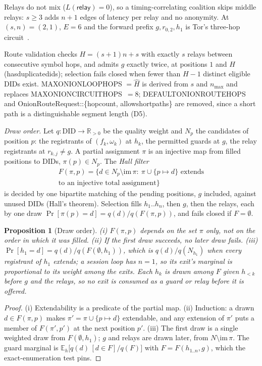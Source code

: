 \documentclass[journal]{IEEEtran}
\newtheorem{proposition}{Proposition}
\newcommand{\relay}{\mathsf{relay}}
\newcommand{\Hm}{\hat H}
\DeclareRobustCommand{\code}[1]{{\ttfamily\renewcommand{\_}{\textunderscore\allowbreak}#1}}
\begin{document}
Relays do not mix ($L(\relay)=0$), so a timing-correlating coalition skips
middle relays: $s\ge3$ adds $n+1$ edges of latency per relay and no
anonymity.  At $(s,n)=(2,1)$, $E=6$ and the forward prefix
$g,r_{0,2},h_1$ is Tor's three-hop circuit~\cite{Dingledine2004}.

Route validation checks $H=(s+1)n+s$ with exactly $s$ relays between
consecutive symbol hops, and admits $g$ exactly twice, at positions $1$
and $H$ (\code{has\_duplicate\_dids}); selection fails closed when fewer
than $H-1$ distinct eligible DIDs exist.  \code{MAX\_ONION\_LOOP\_HOPS}
$=\Hm$ is derived from $s$ and $n_{\max}$ and replaces
\code{MAX\_ONION\_CIRCUIT\_HOPS}~$=8$; \code{DEFAULT\_ONION\_ROUTE\_HOPS}
and \code{OnionRouteRequest::\{hop\_count, allow\_short\_paths\}} are
removed, since a short path is a distinguishable segment length (D5).

\emph{Draw order.}  Let $q:\mathrm{DID}\to\mathbb R_{>0}$ be the quality
weight and $N_p$ the candidates of position $p$: the registrants of
$(f_k,\omega_k)$ at $h_k$, the permitted guards at $g$, the relay
registrants at $r_{k,j}\ne g$.  A partial assignment $\pi$ is an
injective map from filled positions to DIDs, $\pi(p)\in N_p$.  The
\emph{Hall filter}
\begin{gather*}
F(\pi,p)=\{d\in N_p\setminus\mathrm{im}\,\pi:\ \pi\cup\{p\mapsto d\}
\text{ extends}\\
\text{to an injective total assignment}\}
\end{gather*}
is decided by one bipartite matching of the pending positions, $g$
included, against unused DIDs (Hall's theorem).  Selection fills
$h_1..h_n$, then $g$, then the relays, each by one draw
$\Pr[\pi(p)=d]=q(d)/q(F(\pi,p))$, and fails closed if $F=\emptyset$.

\begin{proposition}[Draw order]\label{prop:draw}
(i) $F(\pi,p)$ depends on the set $\pi$ only, not on the order in which
it was filled.  (ii) If the first draw succeeds, no later draw fails.
(iii) $\Pr[h_1=d]=q(d)/q(F(\emptyset,h_1))$, which is $q(d)/q(N_{h_1})$
when every registrant of $h_1$ extends; a session loop has $n=1$, so its
exit's marginal is proportional to its weight among the exits.  Each
$h_k$ is drawn among $F$ given $h_{<k}$ before $g$ and the relays, so no
exit is consumed as a guard or relay before it is offered.
\end{proposition}
\begin{proof}
(i) Extendability is a predicate of the partial map.  (ii) Induction: a
drawn $d\in F(\pi,p)$ makes $\pi'=\pi\cup\{p\mapsto d\}$ extendable, and
any extension of $\pi'$ puts a member of $F(\pi',p')$ at the next
position $p'$.  (iii) The first draw is a single weighted draw from
$F(\emptyset,h_1)$; $g$ and relays are drawn later, from $N\setminus
\mathrm{im}\,\pi$.  The guard marginal is
$\mathbb E_{h}\bigl[q(d)\,[d\in F]/q(F)\bigr]$ with $F=F(h_{1..n},g)$,
which the exact-enumeration test pins.
\end{proof}
\end{document}
